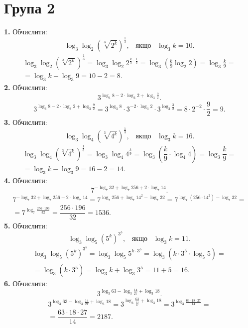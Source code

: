 \section*{Група 2}
\textbf{1.} Обчислити:
$$
\log_{3}\log_{2}\left(\sqrt[3]{2^k}\right)^{\frac{1}{3}}, \;\;\; \mbox{якщо} \;\;\; \log_{3}k=10.
$$
\begin{multline*}
\log_{3}\log_{2}\left(\sqrt[3]{2^k}\right)^{\frac{1}{3}}=
\log_{3}\log_{2}2^{\frac{k}{3}\cdot\frac{1}{3}}=
\log_{3}\left(\frac{k}{9}\log_{2}2\right)=
\log_{3}\frac{k}{9}=\\
=\log_{3}k-\log_{3}9=
10-2=8.
\end{multline*}
\textbf{2.} Обчислити:
$$
3^{\log_{3}8-2\cdot\log_{3}2+\log_{3}\frac{9}{2}}.
$$
\begin{gather*}
3^{\log_{3}8-2\cdot\log_{3}2+\log_{3}\frac{9}{2}}=
3^{\log_{3}8}\cdot3^{-2\cdot\log_{3}2}\cdot3^{\log_{3}\frac{3}{2}}=
8\cdot2^{-2}\cdot\dfrac{9}{2}=9.
\end{gather*}
\textbf{3.} Обчислити:
$$
\log_{3}\log_{4}\left(\sqrt[3]{4^k}\right)^{\frac{1}{3}}, \;\;\; \mbox{якщо} \;\;\; \log_{3}k=16.
$$
\begin{multline*}
\log_{3}\log_{4}\left(\sqrt[3]{4^k}\right)^{\frac{1}{3}}=
\log_{3}\log_{4}4^{\frac{k}{9}}=
\log_{3}\left(\dfrac{k}{9}\cdot\log_{4}4\right)=
\log_{3}\dfrac{k}{9}=\\
=\log_{3}k-\log_{3}9=
16-2=14.
\end{multline*}
\textbf{4.} Обчислити:
$$
7^{-\log_{7}32+\log_{7}256+2\cdot\log_{7}14}.
$$
\begin{multline*}
7^{-\log_{7}32+\log_{7}256+2\cdot\log_{7}14}=
7^{\log_{7}256+\log_{7}14^2-\log_{7}32}=
7^{\log_{7}(256\cdot14^2)-\log_{7}32}=\\
=7^{\log_{7}\frac{256\cdot196}{32}}=
\dfrac{256\cdot196}{32}=1536.
\end{multline*}
\textbf{5.} Обчислити:
$$
\log_{3}\log_{5}\left(5^k\right)^{3^5}, \;\;\; \mbox{якщо} \;\;\; \log_{3}k=11.
$$
\begin{multline*}
\log_{3}\log_{5}\left(5^k\right)^{3^5}=
\log_{3}\log_{5}5^{k\cdot3^5}=
\log_{3}\left(k\cdot3^5\cdot\log_{5}5\right)=\\
=\log_{3}\left(k\cdot3^5\right)=
\log_{3}k+\log_{3}3^5=11+5=16.
\end{multline*}
\textbf{6.} Обчислити:
$$
3^{\log_{3}63-\log_{3}\frac{14}{27}+\log_{3}18}.
$$
\begin{multline*}
3^{\log_{3}63-\log_{3}\frac{14}{27}+\log_{3}18}=
3^{\log_{3}\frac{63}{\frac{14}{27}}+\log_{3}18}=
3^{\log_{3}\frac{63\cdot18\cdot27}{14}}=\\
=\dfrac{63\cdot18\cdot27}{14}=2187.
\end{multline*}
